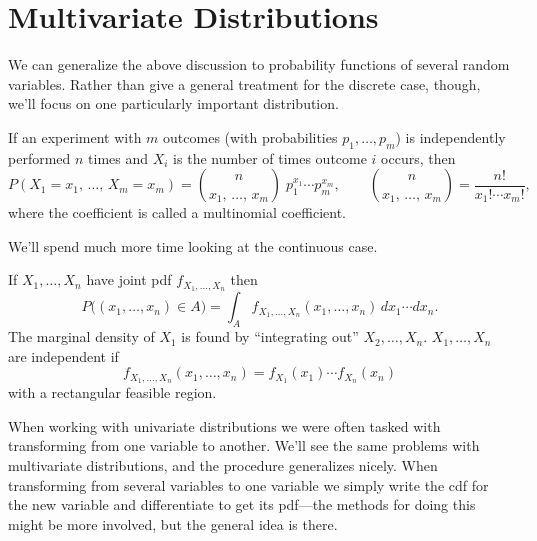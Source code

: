 \documentclass[../m157main.tex]{subfiles}
\begin{document}
\section{Multivariate Distributions}
We can generalize the above discussion to probability functions of several random variables.
Rather than give a general treatment for the discrete case, though, we'll focus on one particularly important distribution.

\pagebreak

\begin{definition}
    If an experiment with $m$ outcomes (with probabilities $p_1, \ldots, p_m$) is independently performed $n$ times and $X_i$ is the number of times outcome $i$ occurs, then
    \[ P(X_1 = x_1, \, \ldots, \, X_m = x_m) = \binom{n}{x_1,\, \ldots,\, x_m} \; p_1^{x_1} \cdots p_m^{x_m}, \qquad \binom{n}{x_1,\, \ldots,\, x_m} = \frac{n!}{x_1! \cdots x_m!}, \]
    where the coefficient is called a multinomial coefficient.
\end{definition}

We'll spend much more time looking at the continuous case.

\begin{definition}
    If $X_1, \ldots, X_n$ have joint pdf $f_{X_1, \ldots, X_n}$ then
    \[ P \big( (x_1, \ldots, x_n) \in A \big) = \int_A f_{X_1, \ldots, X_n} (x_1, \ldots, x_n) \, dx_1 \cdots dx_n. \]
    The marginal density of $X_1$ is found by ``integrating out'' $X_2, \ldots, X_n$.
    $X_1, \ldots, X_n$ are independent if
    \[ f_{X_1, \ldots, X_n} (x_1, \ldots, x_n) = f_{X_1}(x_1) \cdots f_{X_n}(x_n) \]
    with a rectangular feasible region.
\end{definition}

When working with univariate distributions we were often tasked with transforming from one variable to another.
We'll see the same problems with multivariate distributions, and the procedure generalizes nicely.
When transforming from several variables to one variable we simply write the cdf for the new variable and differentiate to get its pdf---the methods for doing this might be more involved, but the general idea is there.
\end{document}
